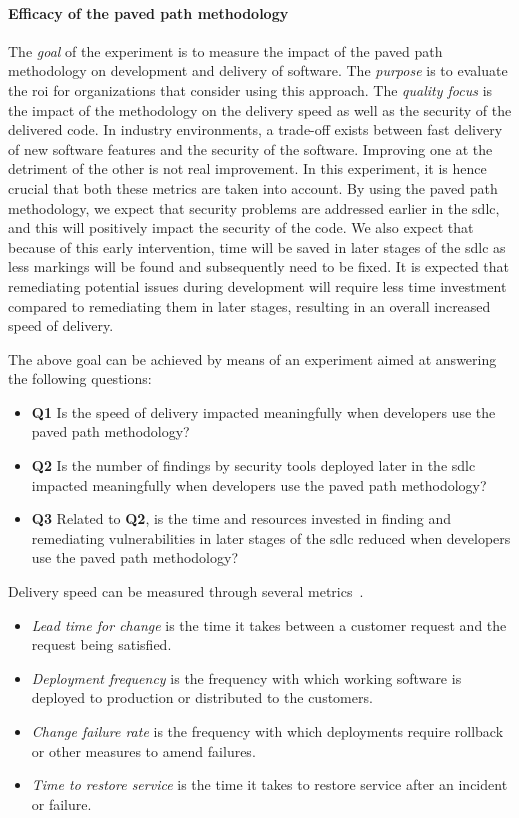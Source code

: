 \paragraph{Efficacy of the paved path methodology}
The \textit{goal} of the experiment is to measure the impact of the paved path methodology on development and delivery of software.
The \textit{purpose} is to evaluate the \gls{roi} for organizations that consider using this approach.
The \textit{quality focus} is the impact of the methodology on the delivery speed as well as the security of the delivered code.
In industry environments, a trade-off exists between fast delivery of new software features and the security of the software.
Improving one at the detriment of the other is not real improvement. 
In this experiment, it is hence crucial that both these metrics are taken into account.
By using the paved path methodology, we expect that security problems are addressed earlier in the \gls{sdlc}, and this will positively impact the security of the code.
We also expect that because of this early intervention, time will be saved in later stages of the \gls{sdlc} as less markings will be found and subsequently need to be fixed.
It is expected that remediating potential issues during development will require less time investment compared to remediating them in later stages, resulting in an overall increased speed of delivery.

The above goal can be achieved by means of an experiment aimed at answering the following questions:
\begin{itemize}
    \item \textbf{Q1} Is the speed of delivery impacted meaningfully when developers use the paved path methodology?
    \item \textbf{Q2} Is the number of findings by security tools deployed later in the \gls{sdlc} impacted meaningfully when developers use the paved path methodology?
    \item \textbf{Q3} Related to \textbf{Q2}, is the time and resources invested in finding and remediating vulnerabilities in later stages of the \gls{sdlc} reduced when developers use the paved path methodology?
\end{itemize}

Delivery speed can be measured through several metrics~\cite{software-delivery-performance}.
\begin{itemize}
    \item \textit{Lead time for change} is the time it takes between a customer request and the request being satisfied.
    \item \textit{Deployment frequency} is the frequency with which working software is deployed to production or distributed to the customers.
    \item \textit{Change failure rate} is the frequency with which deployments require rollback or other measures to amend failures.
    \item \textit{Time to restore service} is the time it takes to restore service after an incident or failure.
\end{itemize}

